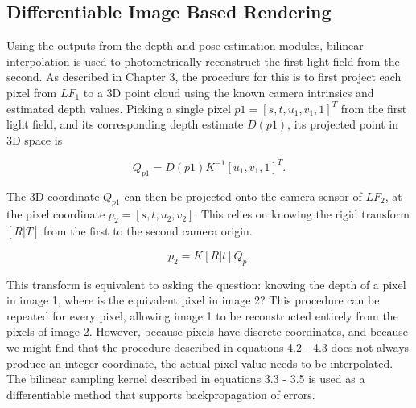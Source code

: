 \documentclass[openany]{book}
\begin{document}





\subsection{Differentiable Image Based Rendering}

Using the outputs from the depth and pose estimation modules, bilinear interpolation is used to photometrically reconstruct the first light field from the second. As described in Chapter 3, the procedure for this is to first project each pixel from $LF_1$ to a 3D point cloud using the known camera intrinsics and estimated depth values. Picking a single pixel $p1 = [s,t,u_1,v_1,1]^T$ from the first light field, and its corresponding depth estimate $D(p1)$, its projected point in 3D space is

\begin{equation}
    Q_{p1} = D(p1) K^{-1}[u_1,v_1,1]^T.
\end{equation}

The 3D coordinate $Q_{p1}$ can then be projected onto the camera sensor of $LF_2$, at the pixel coordinate $p_2 = [s,t,u_2,v_2]$. This relies on knowing the rigid transform $[R|T]$ from the first to the second camera origin.

\begin{equation}
    p_2 = K[R|t]Q_p.
 \end{equation}

This transform is equivalent to asking the question: knowing the depth of a pixel in image 1, where is the equivalent pixel in image 2? This procedure can be repeated for every pixel, allowing image 1 to be reconstructed entirely from the pixels of image 2. However, because pixels have discrete coordinates, and because we might find that the procedure described in equations 4.2 - 4.3 does not always produce an integer coordinate, the actual pixel value needs to be interpolated. The bilinear sampling kernel described in equations 3.3 - 3.5 is used as a differentiable method that supports backpropagation of errors. 
\end{document}

